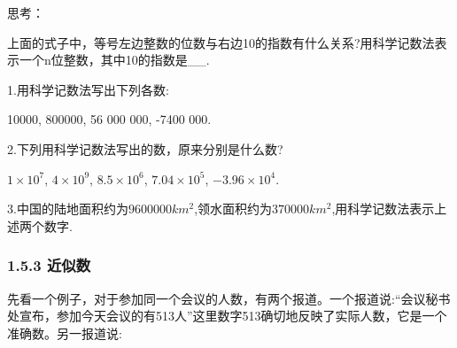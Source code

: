 \documentclass{article}
\begin{document}

\begin{exercise}
思考：

上面的式子中，等号左边整数的位数与右边10的指数有什么关系?用科学记数法表示一个n位整数，其中10的指数是__.
\end{exercise}

\begin{exercise}
1.用科学记数法写出下列各数:

10000, 800000, 56 000 000, -7400 000.

2.下列用科学记数法写出的数，原来分别是什么数?

$1\times10^{7}$, $4\times10^{9}$, $8.5\times10^{6}$, $7.04\times10^{5}$, $-3.96\times10^{4}$.

3.中国的陆地面积约为$9600000km^{2}$,领水面积约为$370000km^{2}$,用科学记数法表示上述两个数字.

\end{exercise}

\subsubsection{1.5.3 近似数}

先看一个例子，对于参加同一个会议的人数，有两个报道。一个报道说:“会议秘书处宣布，参加今天会议的有513人”这里数字513确切地反映了实际人数，它是一个准确数。另一报道说: 
\end{document}
